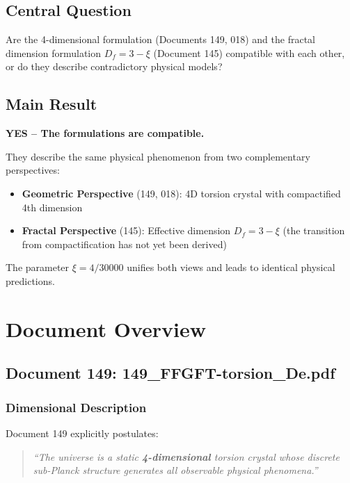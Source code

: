 	\subsection{Central Question}
	
	\begin{important}
		Are the 4-dimensional formulation (Documents 149, 018) and the fractal dimension formulation $D_f = 3-\xi$ (Document 145) compatible with each other, or do they describe contradictory physical models?
	\end{important}
	
	\subsection{Main Result}
	
	\begin{keyresult}
		\textbf{YES -- The formulations are compatible.}
		
		They describe the same physical phenomenon from two complementary perspectives:
		\begin{itemize}
			\item \textbf{Geometric Perspective} (149, 018): 4D torsion crystal with compactified 4th dimension
			\item \textbf{Fractal Perspective} (145): Effective dimension $D_f = 3-\xi$ (the transition from compactification has not yet been derived)
		\end{itemize}
		
		The parameter $\xi = 4/30000$ unifies both views and leads to identical physical predictions.
	\end{keyresult}
	
	\section{Document Overview}
	
	\subsection{Document 149: 149\_FFGFT-torsion\_De.pdf}
	
	\subsubsection{Dimensional Description}
	
	Document 149 explicitly postulates:
	
	\begin{quote}
		\textit{\enquote{The universe is a static \textbf{4-dimensional} torsion crystal whose discrete sub-Planck structure generates all observable physical phenomena.}}
	\end{quote}
	
